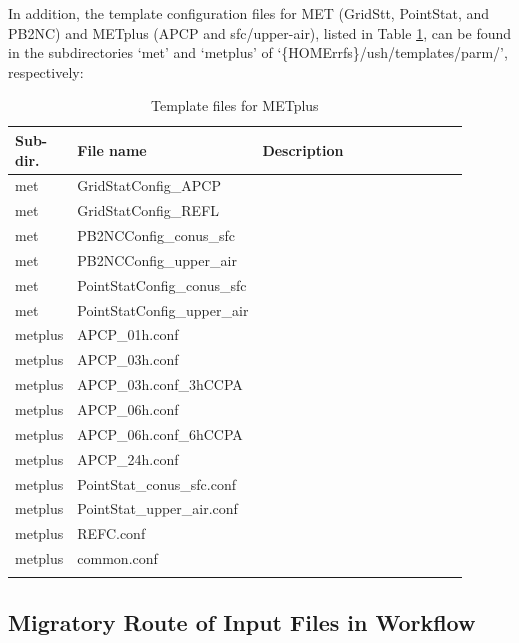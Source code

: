 \documentclass[11pt,fleqn]{report}              %
\begin{document}
In addition, the template configuration files for MET (GridStt, PointStat, and PB2NC) and METplus (APCP and sfc/upper-air), listed in Table \ref{table:template_metplus}, can be found in the subdirectories `met' and `metplus' of `\{HOMErrfs\}/ush/templates/parm/', respectively:
{
\fontsize{10}{12}\selectfont
\begin{longtable}{p{0.08\linewidth} | p{0.25\linewidth} | p{0.57\linewidth}   }
\hline
\hline
Sub-dir. & File name & Description  \\
\hline
met & GridStatConfig\_APCP & \\
met & GridStatConfig\_REFL & \\
met & PB2NCConfig\_conus\_sfc & \\
met & PB2NCConfig\_upper\_air & \\
met & PointStatConfig\_conus\_sfc & \\
met & PointStatConfig\_upper\_air & \\
\hdashline
metplus & APCP\_01h.conf & \\
metplus & APCP\_03h.conf & \\
metplus & APCP\_03h.conf\_3hCCPA & \\
metplus & APCP\_06h.conf & \\
metplus & APCP\_06h.conf\_6hCCPA & \\
metplus & APCP\_24h.conf & \\
metplus & PointStat\_conus\_sfc.conf & \\
metplus & PointStat\_upper\_air.conf & \\
metplus & REFC.conf & \\
metplus & common.conf & \\
\hline
\caption{Template files for METplus}
\label{table:template_metplus}
\end{longtable}
}



\subsection{Migratory Route of Input Files in Workflow}
\label{subsec:route_input}
\end{document}
